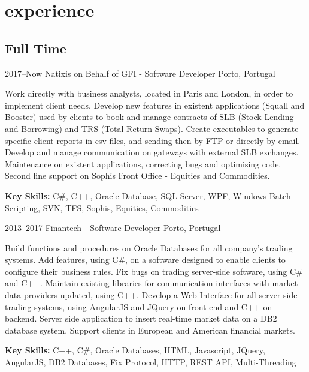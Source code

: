 \documentclass[]{friggeri-cv} %
\begin{document}

\section{experience}

\subsection{Full Time}

\begin{entrylist}


\entry
{2017--Now}
{Natixis on Behalf of GFI - Software Developer}
{Porto, Portugal}
{
Work directly with business analysts, located in Paris and London, in order to implement client needs. Develop new features in existent applications (Squall and Booster) used by clients to book and manage contracts of SLB (Stock Lending and Borrowing) and TRS (Total Return Swaps).  Create executables to generate specific client reports in csv files, and sending then by FTP or directly by email. Develop and manage communication on gateways with external SLB exchanges. Maintenance on existent applications, correcting bugs and optimising code. Second line support on Sophis Front Office - Equities and Commodities.

\textbf{Key Skills:}
C\#, C++, Oracle Database, SQL Server, WPF, Windows Batch Scripting, SVN, TFS, Sophis, Equities, Commodities
}


\entry
{2013--2017}
{Finantech - Software Developer}
{Porto, Portugal}
{
Build functions and procedures on Oracle Databases for all company's trading systems. Add features, using C\#, on a software designed to enable clients to configure their business rules. Fix bugs on trading server-side software, using C\# and C++. Maintain existing libraries for communication interfaces with market data providers updated, using C++. Develop a Web Interface for all server side trading systems, using AngularJS and JQuery on front-end and C++ on backend. Server side application to insert real-time market data on a DB2 database system. Support clients in European and American financial markets. 

\textbf{Key Skills: }
C++, C\#, Oracle Databases, HTML, Javascript, JQuery, AngularJS, DB2 Databases, Fix Protocol, HTTP, REST API, Multi-Threading
}


\end{entrylist}
\end{document}
